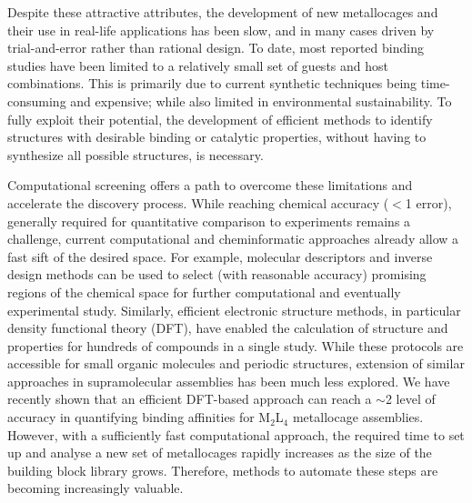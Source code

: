 \documentclass[../../main.tex]{subfiles}
\newcommand{\MLf}{M$_2$L$_4$ }
\begin{document}
Despite these attractive attributes, the development of new metallocages and their use in real-life applications has been slow, and in many cases driven by trial-and-error rather than rational design. To date, most reported binding studies have been limited to a relatively small set of guests and host combinations. This is primarily due to current synthetic techniques being time-consuming and expensive; while also limited in environmental sustainability.\cite{Erythropel2018} To fully exploit their potential, the development of efficient methods to identify structures with desirable binding or catalytic properties, without having to synthesize all possible structures, is necessary. 

Computational screening offers a path to overcome these limitations and accelerate the discovery process.\cite{Poree2017} While reaching chemical accuracy ($<$1 \kcalx error), generally required for quantitative comparison to experiments remains a challenge,\cite{Neese2019} current computational and cheminformatic approaches already allow a fast sift of the desired space. For example, molecular descriptors\cite{Xu2002, Durand2019, Greenaway2018} and inverse design methods\cite{Freeze2019} can be used to select (with reasonable accuracy) promising regions of the chemical space for further computational and eventually experimental study.\cite{Foscato2020} Similarly, efficient electronic structure methods, in particular density functional theory (DFT), have enabled the calculation of structure and properties for hundreds of compounds in a single study.\cite{Rosales2019, Guan2018} While these protocols are accessible for small organic molecules and periodic structures, extension of similar approaches in supramolecular assemblies has been much less explored.\cite{Hachmann2011} We have recently shown that an efficient DFT-based approach can reach a $\sim$2 \kcalx level of accuracy in quantifying binding affinities for \MLf metallocage assemblies.\cite{Young2019} However, with a sufficiently fast computational approach, the required time to set up and analyse a new set of metallocages rapidly increases as the size of the building block library grows. Therefore, methods to automate these steps are becoming increasingly valuable. 
\end{document}
